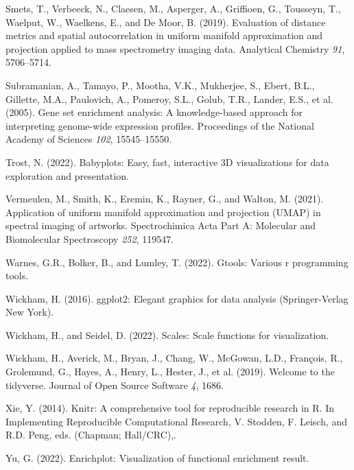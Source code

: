 \documentclass[
]{article}
\newlength{\cslhangindent}
\newlength{\cslentryspacingunit} %
\newenvironment{CSLReferences}[2] %
 {%
  \setlength{\parindent}{0pt}
  \ifodd #1
  \let\oldpar\par
  \def\par{\hangindent=\cslhangindent\oldpar}
  \fi
  \setlength{\parskip}{#2\cslentryspacingunit}
 }%
 {}
\begin{document}
\begin{CSLReferences}{0}{0}
\leavevmode{}%
Smets, T., Verbeeck, N., Claesen, M., Asperger, A., Griffioen, G.,
Tousseyn, T., Waelput, W., Waelkens, E., and De Moor, B. (2019).
Evaluation of distance metrics and spatial autocorrelation in uniform
manifold approximation and projection applied to mass spectrometry
imaging data. Analytical Chemistry \emph{91}, 5706--5714.

\leavevmode{}%
Subramanian, A., Tamayo, P., Mootha, V.K., Mukherjee, S., Ebert, B.L.,
Gillette, M.A., Paulovich, A., Pomeroy, S.L., Golub, T.R., Lander, E.S.,
et al. (2005). Gene set enrichment analysis: A knowledge-based approach
for interpreting genome-wide expression profiles. Proceedings of the
National Academy of Sciences \emph{102}, 15545--15550.

\leavevmode{}%
Trost, N. (2022). Babyplots: Easy, fast, interactive 3D visualizations
for data exploration and presentation.

\leavevmode{}%
Vermeulen, M., Smith, K., Eremin, K., Rayner, G., and Walton, M. (2021).
Application of uniform manifold approximation and projection (UMAP) in
spectral imaging of artworks. Spectrochimica Acta Part A: Molecular and
Biomolecular Spectroscopy \emph{252}, 119547.

\leavevmode{}%
Warnes, G.R., Bolker, B., and Lumley, T. (2022). Gtools: Various r
programming tools.

\leavevmode{}%
Wickham, H. (2016). ggplot2: Elegant graphics for data analysis
(Springer-Verlag New York).

\leavevmode{}%
Wickham, H., and Seidel, D. (2022). Scales: Scale functions for
visualization.

\leavevmode{}%
Wickham, H., Averick, M., Bryan, J., Chang, W., McGowan, L.D., François,
R., Grolemund, G., Hayes, A., Henry, L., Hester, J., et al. (2019).
Welcome to the {tidyverse}. Journal of Open Source Software \emph{4},
1686.

\leavevmode{}%
Xie, Y. (2014). Knitr: A comprehensive tool for reproducible research in
{R}. In Implementing Reproducible Computational Research, V. Stodden, F.
Leisch, and R.D. Peng, eds. (Chapman; Hall/CRC),.

\leavevmode{}%
Yu, G. (2022). Enrichplot: Visualization of functional enrichment
result.

\end{CSLReferences}
\end{document}
